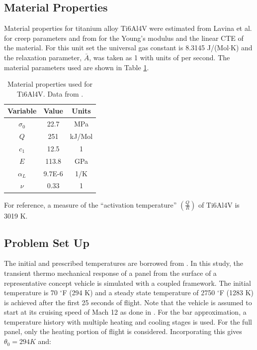 \documentclass[conf]{new-aiaa}
\begin{document}
\subsection{Material Properties}
Material properties for titanium alloy Ti6Al4V were estimated from
Lavina et al. \cite{ lavina_creep_behavior_of_Ti6Al4V_from_450C_to_600C}
for creep parameters and from \cite{
boyer_materials_properties_handbook_titanium_alloys}
for the Young's modulus and the linear CTE of the material.
For this unit set the universal gas constant is 8.3145 J/(Mol$\cdot$K)
and the relaxation parameter, $\bar{A}$, was taken as 1 with units of per second.
The material parameters used are shown in Table \ref{tab_material_properties}.

\begin{table}[H]
  \centering
  \caption{
    Material properties used for Ti6Al4V.
    Data from 
    \cite{ lavina_creep_behavior_of_Ti6Al4V_from_450C_to_600C,
      boyer_materials_properties_handbook_titanium_alloys}.}
  \begin{tabular}{|c|c|c|}
    \hline
    Variable & Value & Units  \\
    \hline
    $\sigma_0$ & 22.7  & MPa    \\
    $Q$      & 251     & kJ/Mol \\
    $c_1$    & 12.5    & 1      \\
    $E$      & 113.8   & GPa    \\
    $\alpha_L$ & 9.7E-6  & 1/K    \\
    $\nu$    & 0.33    & 1      \\
    \hline
  \end{tabular}
  \label{tab_material_properties}
\end{table}

\noindent
For reference, a measure of the ``activation temperature'' 
$\left(\frac{Q}{R}\right)$ of Ti6Al4V is 3019 K.

\subsection{Problem Set Up}
The initial and prescribed temperatures are borrowed from 
\cite{ culler_impact_of_FTS_coupling_on_response_prediction_hypersonic_skin_panels}.
In this study, the transient thermo mechanical response of a panel from the 
surface of a representative concept vehicle is simulated with a coupled framework.
The initial temperature is 70 $^{\circ}$F (294 K) and a steady state temperature 
of 2750 $^{\circ}$F (1283 K) is achieved after the first 25 seconds of flight.
Note that the vehicle is assumed to start at its cruising speed of Mach 12
as done in \cite{ culler_impact_of_FTS_coupling_on_response_prediction_hypersonic_skin_panels}.
For the bar approximation, a temperature history with multiple
heating and cooling stages is used.
For the full panel, only the heating portion of flight is considered.
Incorporating this gives $\theta_0 = 294 K$ and:
\end{document}
